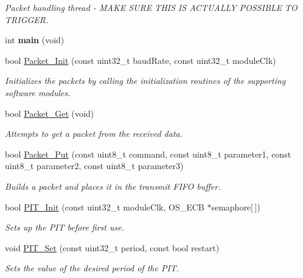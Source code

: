 \begin{DoxyCompactItemize}
\begin{DoxyCompactList}\small\item\em Packet handling thread -\/ M\+A\+K\+E S\+U\+R\+E T\+H\+I\+S I\+S A\+C\+T\+U\+A\+L\+L\+Y P\+O\+S\+S\+I\+B\+L\+E T\+O T\+R\+I\+G\+G\+E\+R. \end{DoxyCompactList}\item 
\hypertarget{group__main__module_ga840291bc02cba5474a4cb46a9b9566fe}{}int {\bfseries main} (void)\label{group__main__module_ga840291bc02cba5474a4cb46a9b9566fe}

\item 
bool \hyperlink{group__main__module_ga414aa3f521fdfd6e4586d98a946b6ab2}{Packet\+\_\+\+Init} (const uint32\+\_\+t baud\+Rate, const uint32\+\_\+t module\+Clk)
\begin{DoxyCompactList}\small\item\em Initializes the packets by calling the initialization routines of the supporting software modules. \end{DoxyCompactList}\item 
bool \hyperlink{group__main__module_gac58a17928cd5e556e1567b2fde9f88f0}{Packet\+\_\+\+Get} (void)
\begin{DoxyCompactList}\small\item\em Attempts to get a packet from the received data. \end{DoxyCompactList}\item 
bool \hyperlink{group__main__module_ga431a1e1da25a8214a502ec81f88fc3f1}{Packet\+\_\+\+Put} (const uint8\+\_\+t command, const uint8\+\_\+t parameter1, const uint8\+\_\+t parameter2, const uint8\+\_\+t parameter3)
\begin{DoxyCompactList}\small\item\em Builds a packet and places it in the transmit F\+I\+F\+O buffer. \end{DoxyCompactList}\item 
bool \hyperlink{group__main__module_ga917cbc0a1cc3170383fe09ffdf83be94}{P\+I\+T\+\_\+\+Init} (const uint32\+\_\+t module\+Clk, O\+S\+\_\+\+E\+C\+B $\ast$semaphore\mbox{[}$\,$\mbox{]})
\begin{DoxyCompactList}\small\item\em Sets up the P\+I\+T before first use. \end{DoxyCompactList}\item 
void \hyperlink{group__main__module_gae012c6f6b7396828c558c92ad0a27ed5}{P\+I\+T\+\_\+\+Set} (const uint32\+\_\+t period, const bool restart)
\begin{DoxyCompactList}\small\item\em Sets the value of the desired period of the P\+I\+T. \end{DoxyCompactList}\item 

\end{DoxyCompactItemize}
